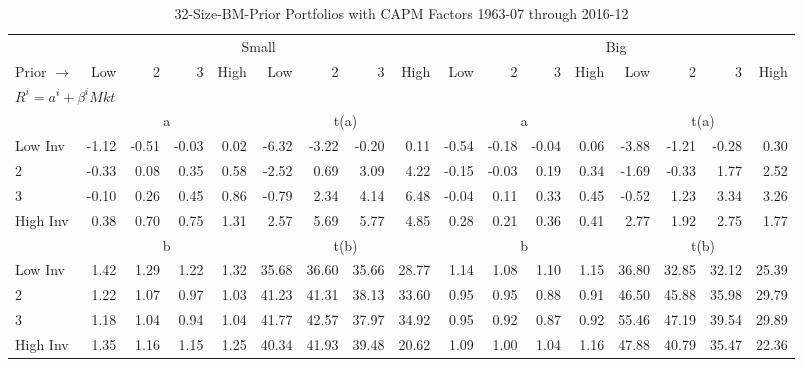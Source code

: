 
\begin{table}[!ht]
\centering
\caption{32-Size-BM-Prior Portfolios with CAPM Factors 1963-07 through 2016-12}
\begin{tabular}{lrrrrrrrrrrrrrrrr}
  \toprule
    & \multicolumn{8}{c}{Small} & \multicolumn{8}{c}{Big} \\
      \cmidrule(r){2-9} \cmidrule(r){10-17}
    Prior $\rightarrow$ & Low & 2 & 3 & High & Low & 2 & 3 & High & Low & 2 & 3 & High & Low & 2 & 3 & High \\ 
  \midrule
  \multicolumn{17}{l}{$R^i=a^i+\beta^iMkt$} \\

  
    
      & \multicolumn{4}{c}{a} & \multicolumn{4}{c}{t(a)}
    
      & \multicolumn{4}{c}{a} & \multicolumn{4}{c}{t(a)}
    
    \\
      \cmidrule(r){2-5} \cmidrule(r){6-9} \cmidrule(r){10-13} \cmidrule(r){14-17}

    Low Inv   & -1.12  & -0.51  & -0.03  & 0.02  & -6.32  & -3.22  & -0.20  & 0.11  & -0.54  & -0.18  & -0.04  & 0.06  & -3.88  & -1.21  & -0.28  & 0.30  \\
           2  & -0.33  & 0.08  & 0.35  & 0.58  & -2.52  & 0.69  & 3.09  & 4.22  & -0.15  & -0.03  & 0.19  & 0.34  & -1.69  & -0.33  & 1.77  & 2.52  \\
           3  & -0.10  & 0.26  & 0.45  & 0.86  & -0.79  & 2.34  & 4.14  & 6.48  & -0.04  & 0.11  & 0.33  & 0.45  & -0.52  & 1.23  & 3.34  & 3.26  \\
    High Inv  & 0.38  & 0.70  & 0.75  & 1.31  & 2.57  & 5.69  & 5.77  & 4.85  & 0.28  & 0.21  & 0.36  & 0.41  & 2.77  & 1.92  & 2.75  & 1.77  \\

  
    
      & \multicolumn{4}{c}{b} & \multicolumn{4}{c}{t(b)}
    
      & \multicolumn{4}{c}{b} & \multicolumn{4}{c}{t(b)}
    
    \\
      \cmidrule(r){2-5} \cmidrule(r){6-9} \cmidrule(r){10-13} \cmidrule(r){14-17}

    Low Inv   & 1.42  & 1.29  & 1.22  & 1.32  & 35.68  & 36.60  & 35.66  & 28.77  & 1.14  & 1.08  & 1.10  & 1.15  & 36.80  & 32.85  & 32.12  & 25.39  \\
           2  & 1.22  & 1.07  & 0.97  & 1.03  & 41.23  & 41.31  & 38.13  & 33.60  & 0.95  & 0.95  & 0.88  & 0.91  & 46.50  & 45.88  & 35.98  & 29.79  \\
           3  & 1.18  & 1.04  & 0.94  & 1.04  & 41.77  & 42.57  & 37.97  & 34.92  & 0.95  & 0.92  & 0.87  & 0.92  & 55.46  & 47.19  & 39.54  & 29.89  \\
    High Inv  & 1.35  & 1.16  & 1.15  & 1.25  & 40.34  & 41.93  & 39.48  & 20.62  & 1.09  & 1.00  & 1.04  & 1.16  & 47.88  & 40.79  & 35.47  & 22.36  \\

  

  \bottomrule
\end{tabular}
\label{tbl:32_Size_BM_Prior_CAPM}
\end{table}
